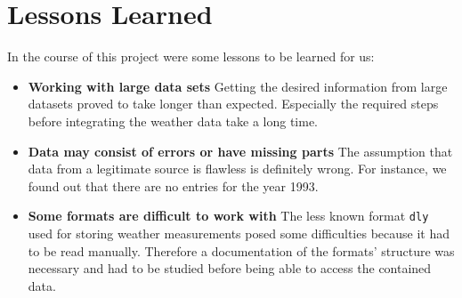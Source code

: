 \section{Lessons Learned}

In the course of this project were some lessons to be learned for us:
\begin{itemize}
	\item \textbf{Working with large data sets} Getting the desired information from large datasets proved to take longer than expected. Especially the required steps before integrating the weather data take a long time.
	\item \textbf{Data may consist of errors or have missing parts} The assumption that data from a legitimate source is flawless is definitely wrong. For instance, we found out that there are no entries for the year 1993.
	\item \textbf{Some formats are difficult to work with} The less known format \texttt{dly} used for storing weather measurements posed some difficulties because it had to be read manually. Therefore a documentation of the formats' structure was necessary and had to be studied before being able to access the contained data.
\end{itemize}